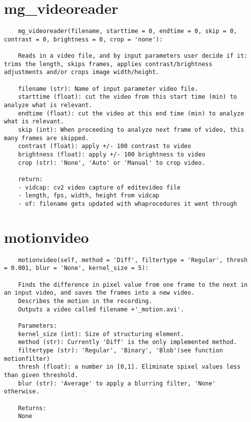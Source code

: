 \documentclass[9pt]{extarticle}
\begin{document}
\section*{mg\_videoreader}
    \begin{verbatim}
    mg_videoreader(filename, starttime = 0, endtime = 0, skip = 0, contrast = 0, brightness = 0, crop = 'none'):
    
    Reads in a video file, and by input parameters user decide if it: trims the length, skips frames, applies contrast/brightness adjustments and/or crops image width/height.
    
    filename (str): Name of input parameter video file.
    starttime (float): cut the video from this start time (min) to analyze what is relevant.
    endtime (float): cut the video at this end time (min) to analyze what is relevant.
    skip (int): When proceeding to analyze next frame of video, this many frames are skipped.
    contrast (float): apply +/- 100 contrast to video
    brightness (float): apply +/- 100 brightness to video
    crop (str): 'None', 'Auto' or 'Manual' to crop video.
    
    return:
    - vidcap: cv2 video capture of editevideo file
    - length, fps, width, height from vidcap
    - of: filename gets updated with whaprocedures it went through
    \end{verbatim}

\section*{motionvideo}    
    \begin{verbatim}
    motionvideo(self, method = 'Diff', filtertype = 'Regular', thresh = 0.001, blur = 'None', kernel_size = 5):
    
    Finds the difference in pixel value from one frame to the next in an input video, and saves the frames into a new video.
    Describes the motion in the recording.    
    Outputs a video called filename +'_motion.avi'.
    
    Parameters:
    kernel_size (int): Size of structuring element.
    method (str): Currently 'Diff' is the only implemented method. 
    filtertype (str): 'Regular', 'Binary', 'Blob'(see function motionfilter) 
    thresh (float): a number in [0,1]. Eliminate spixel values less than given threshold.
    blur (str): 'Average' to apply a blurring filter, 'None' otherwise.
    
    Returns:
    None
    \end{verbatim}
\end{document}

